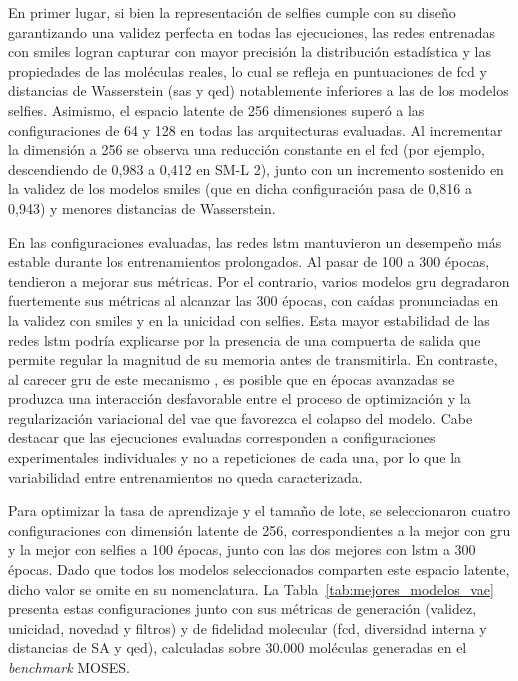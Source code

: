 En primer lugar, si bien la representación de \gls{selfies} cumple con su diseño garantizando una validez perfecta en todas las ejecuciones, las redes entrenadas con \gls{smiles} logran capturar con mayor precisión la distribución estadística y las propiedades de las moléculas reales, lo cual se refleja en puntuaciones de \gls{fcd} y distancias de Wasserstein (\gls{sas} y \gls{qed}) notablemente inferiores a las de los modelos \gls{selfies}. Asimismo, el espacio latente de 256 dimensiones superó a las configuraciones de 64 y 128 en todas las arquitecturas evaluadas. Al incrementar la dimensión a 256 se observa una reducción constante en el \gls{fcd} (por ejemplo, descendiendo de 0,983 a 0,412 en SM-L 2), junto con un incremento sostenido en la validez de los modelos \gls{smiles} (que en dicha configuración pasa de 0,816 a 0,943) y menores distancias de Wasserstein.

En las configuraciones evaluadas, las redes \gls{lstm} mantuvieron un desempeño más estable durante los entrenamientos prolongados. Al pasar de 100 a 300 épocas, tendieron a mejorar sus métricas. Por el contrario, varios modelos \gls{gru} degradaron fuertemente sus métricas al alcanzar las 300 épocas, con caídas pronunciadas en la validez con \gls{smiles} y en la unicidad con \gls{selfies}. Esta mayor estabilidad de las redes \gls{lstm} podría explicarse por la presencia de una compuerta de salida que permite regular la magnitud de su memoria antes de transmitirla. En contraste, al carecer \gls{gru} de este mecanismo \cite{chung2014empirical}, es posible que en épocas avanzadas se produzca una interacción desfavorable entre el proceso de optimización y la regularización variacional del \gls{vae} que favorezca el colapso del modelo. Cabe destacar que las ejecuciones evaluadas corresponden a configuraciones experimentales individuales y no a repeticiones de cada una, por lo que la variabilidad entre entrenamientos no queda caracterizada.

Para optimizar la tasa de aprendizaje y el tamaño de lote, se seleccionaron cuatro configuraciones con dimensión latente de 256, correspondientes a la mejor con \gls{gru} y la mejor con \gls{selfies} a 100 épocas, junto con las dos mejores con \gls{lstm} a 300 épocas. Dado que todos los modelos seleccionados comparten este espacio latente, dicho valor se omite en su nomenclatura. La Tabla~\ref{tab:mejores_modelos_vae} presenta estas configuraciones junto con sus métricas de generación (validez, unicidad, novedad y filtros) y de fidelidad molecular (\gls{fcd}, diversidad interna y distancias de SA y \gls{qed}), calculadas sobre 30.000 moléculas generadas en el \textit{benchmark} MOSES.

